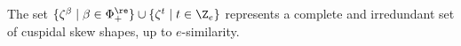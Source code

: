 \begin{theorem}\label{allcusp}
The set \(\{\zeta^{\beta} \mid \beta \in \Phi_+^\re\} \cup \{\zeta^t \mid t \in \Z_e\}\) represents a complete and irredundant set of cuspidal skew shapes, up to \(e\)-similarity.
\end{theorem}
